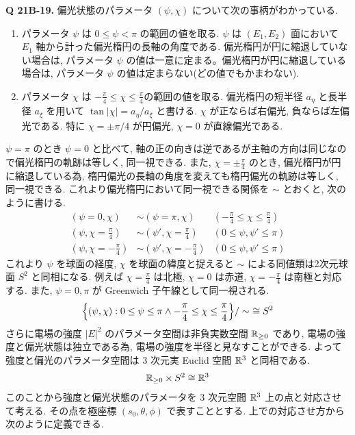 \documentclass[uplatex,a4paper,dvipdfmx]{jsarticle}
\theoremstyle{definition}
\begin{document}
\textbf{Q 21B-19.}
偏光状態のパラメータ $(\psi, \chi)$ について次の事柄がわかっている.
\begin{enumerate}
  \item パラメータ $\psi$ は $0\leq\psi<\pi$ の範囲の値を取る. $\psi$ は $(E_1, E_2)$ 面において $E_1$ 軸から計った偏光楕円の長軸の角度である. 偏光楕円が円に縮退していない場合は, パラメータ $\psi$ の値は一意に定まる。偏光楕円が円に縮退している場合は, パラメータ $\psi$ の値は定まらない(どの値でもかまわない).
  \item  パラメータ $\chi$ は $-\frac{\pi}{4}\leq\chi\leq\frac{\pi}{4}$の範囲の値を取る. 偏光楕円の短半径 $a_\eta$ と長半径 $a_\xi$ を用いて $\tan|\chi| = a_\eta/a_\xi$ と書ける. $\chi$ が正ならば右偏光, 負ならば左偏光である. 特に $\chi = \pm \pi/4$ が円偏光, $\chi = 0$ が直線偏光である.
\end{enumerate}
$\psi = \pi$ のとき $\psi = 0$ と比べて, 軸の正の向きは逆であるが主軸の方向は同じなので偏光楕円の軌跡は等しく, 同一視できる. また, $\chi = \pm\frac{\pi}{4}$ のとき, 偏光楕円が円に縮退している為, 楕円偏光の長軸の角度を変えても楕円偏光の軌跡は等しく, 同一視できる. これより偏光楕円において同一視できる関係を $\sim$ とおくと, 次のように書ける.
\begin{align}
  (\psi = 0, \chi)              & \sim (\psi = \pi, \chi)             & (-\frac{\pi}{4}\leq\chi\leq\frac{\pi}{4}) \\
  (\psi, \chi = \frac{\pi}{4})  & \sim (\psi', \chi = \frac{\pi}{4})  & (0\leq\psi,\psi'\leq\pi)                  \\
  (\psi, \chi = -\frac{\pi}{4}) & \sim (\psi', \chi = -\frac{\pi}{4}) & (0\leq\psi,\psi'\leq\pi)
\end{align}
これより $\psi$ を球面の経度, $\chi$ を球面の緯度と捉えると $\sim$ による同値類は2次元球面 $S^2$ と同相になる. 例えば $\chi = \frac{\pi}{4}$ は北極, $\chi = 0$ は赤道, $\chi = -\frac{\pi}{4}$ は南極と対応する. また, $\psi = 0,\pi$ が Greenwich 子午線として同一視される.
\begin{align}
  \qty{(\psi, \chi):0\leq\psi\leq\pi \land -\frac{\pi}{4}\leq\chi\leq\frac{\pi}{4}}/\sim\ \cong S^2
\end{align}
さらに電場の強度 $|E|^2$ のパラメータ空間は非負実数空間 $\mathbb{R}_{\geq0}$ であり, 電場の強度と偏光状態は独立である為, 電場の強度を半径と見なすことができる. よって強度と偏光のパラメータ空間は 3 次元実 Euclid 空間 $\mathbb{R}^3$ と同相である.
\begin{align}
  \mathbb{R}_{\geq 0}\times S^2 \cong \mathbb{R}^3
\end{align}
このことから強度と偏光状態のパラメータを 3 次元空間 $\mathbb{R}^3$ 上の点と対応させて考える. その点を極座標 $(s_0, \theta, \phi)$ で表すこととする. 上での対応させ方から次のように定義できる.
\end{document}
